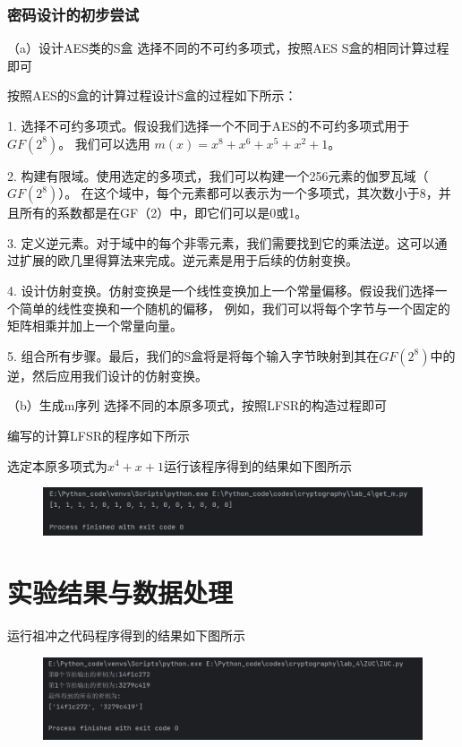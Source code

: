 \documentclass[a4paper,11pt,UTF8]{ctexart}
\newcommand{\bottomcaption}{%
\setlength{\abovecaptionskip}{6pt}%
\setlength{\belowcaptionskip}{6pt}%
\caption}
\newcommand{\xiaowuhao}{\fontsize{9pt}{\baselineskip}\selectfont}   %
\begin{document}
    \subsubsection{密码设计的初步尝试}
      （a）设计AES类的S盒
      选择不同的不可约多项式，按照AES S盒的相同计算过程即可\par
      按照AES的S盒的计算过程设计S盒的过程如下所示：\par
      1. 选择不可约多项式。假设我们选择一个不同于AES的不可约多项式用于$GF(2^{8})$。
        我们可以选用 $m(x) = x^{8} + x^{6} + x^{5} + x^{2} + 1$。\par
      2. 构建有限域。使用选定的多项式，我们可以构建一个256元素的伽罗瓦域（$GF(2^{8})$）。
        在这个域中，每个元素都可以表示为一个多项式，其次数小于8，并且所有的系数都是在GF（2）中，即它们可以是0或1。\par
      3. 定义逆元素。对于域中的每个非零元素，我们需要找到它的乘法逆。这可以通过扩展的欧几里得算法来完成。逆元素是用于后续的仿射变换。\par
      4. 设计仿射变换。仿射变换是一个线性变换加上一个常量偏移。假设我们选择一个简单的线性变换和一个随机的偏移，
        例如，我们可以将每个字节与一个固定的矩阵相乘并加上一个常量向量。\par
      5. 组合所有步骤。最后，我们的S盒将是将每个输入字节映射到其在$GF(2^{8})$中的逆，然后应用我们设计的仿射变换。\par
      （b）生成m序列
      选择不同的本原多项式，按照LFSR的构造过程即可\par
      编写的计算LFSR的程序如下所示
      \par
      选定本原多项式为$x^{4}+x+1$运行该程序得到的结果如下图所示
      \begin{figure}[H]
        \centering
        \includegraphics[width=13cm]{get_m_result.png}
        \bottomcaption{\xiaowuhao{计算m序列结果}}
      \end{figure}

    
\section{实验结果与数据处理}
  运行祖冲之代码程序得到的结果如下图所示
  \begin{figure}[H]
    \centering
    \includegraphics[width=13cm]{ZUC_result.png}
    \bottomcaption{\xiaowuhao{祖冲之密码算法结果}}
  \end{figure}
    
\end{document}
